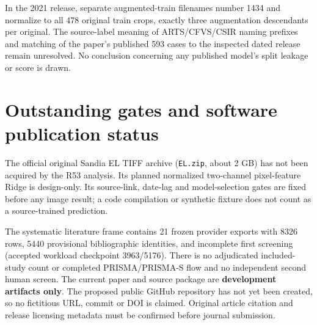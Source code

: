\documentclass[10pt,a4paper]{article}
\begin{document}
In the 2021 release, separate augmented-train filenames number 1434 and normalize to all 478 original train crops, exactly three augmentation descendants per original. The source-label meaning of ARTS/CFVS/CSIR naming prefixes and matching of the paper's published 593 cases to the inspected dated release remain unresolved. No conclusion concerning any published model's split leakage or score is drawn.

\section{Outstanding gates and software publication status}
The official original Sandia EL TIFF archive (\texttt{EL.zip}, about 2 GB) has not been acquired by the R53 analysis. Its planned normalized two-channel pixel-feature Ridge is design-only. Its source-link, date-lag and model-selection gates are fixed before any image result; a code compilation or synthetic fixture does not count as a source-trained prediction.

The systematic literature frame contains 21 frozen provider exports with 8326 rows, 5440 provisional bibliographic identities, and incomplete first screening (accepted workload checkpoint 3963/5176). There is no adjudicated included-study count or completed PRISMA/PRISMA-S flow and no independent second human screen. The current paper and source package are \textbf{development artifacts only}. The proposed public GitHub repository has not yet been created, so no fictitious URL, commit or DOI is claimed. Original article citation and release licensing metadata must be confirmed before journal submission.
\end{document}
